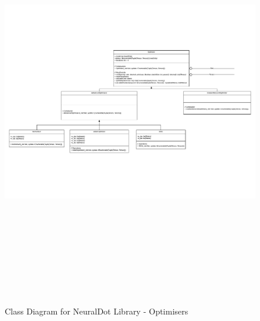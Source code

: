 \begin{figure}[H]
    \centering
    \includegraphics[width=18cm, height=18cm, angle=90]{Design/Overview/UMLCharts/NeuralDotUMLSeperated-Optimisers.pdf}
    \caption{Class Diagram for NeuralDot Library - Optimisers}
    \label{fig:Class Diagram for NeuralDot Library - Optimisers}
\end{figure}

